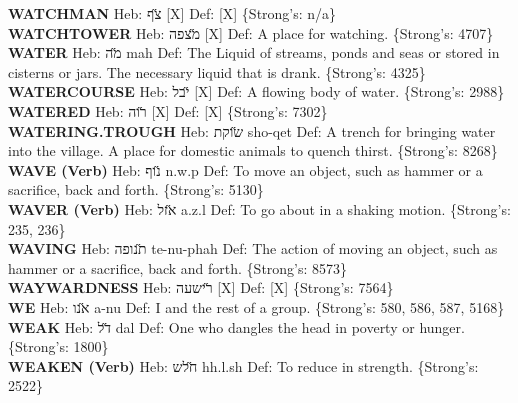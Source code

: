 {\textbf{WATCHMAN} Heb: {\large\H צף} {[}X{]} Def: {[}X{]} \{Strong's: n/a\}\hfill{}\\

\textbf{WATCHTOWER} Heb: {\large\H מצפה} {[}X{]} Def: A place for watching. \{Strong's: 4707\}\hfill{}\\

\textbf{WATER} Heb: {\large\H מה} mah Def: The Liquid of streams, ponds and seas or stored in cisterns or jars. The necessary liquid that is drank. \{Strong's: 4325\}\hfill{}\\

\textbf{WATERCOURSE} Heb: {\large\H יבל} {[}X{]} Def: A flowing body of water. \{Strong's: 2988\}\hfill{}\\

\textbf{WATERED} Heb: {\large\H רוה} {[}X{]} Def: {[}X{]} \{Strong's: 7302\}\hfill{}\\

\textbf{WATERING.TROUGH} Heb: {\large\H שוקת} sho-qet Def: A trench for bringing water into the village. A place for domestic animals to quench thirst. \{Strong's: 8268\}\hfill{}\\

\textbf{WAVE (Verb)} Heb: {\large\H נוף} n.w.p Def: To move an object, such as hammer or a sacrifice, back and forth. \{Strong's: 5130\}\hfill{}\\

\textbf{WAVER (Verb)} Heb: {\large\H אזל} a.z.l Def: To go about in a shaking motion. \{Strong's: 235, 236\}\hfill{}\\

\textbf{WAVING} Heb: {\large\H תנופה} te-nu-phah Def: The action of moving an object, such as hammer or a sacrifice, back and forth. \{Strong's: 8573\}\hfill{}\\

\textbf{WAYWARDNESS} Heb: {\large\H רישעה} {[}X{]} Def: {[}X{]} \{Strong's: 7564\}\hfill{}\\

\textbf{WE} Heb: {\large\H אנו} a-nu Def: I and the rest of a group. \{Strong's: 580, 586, 587, 5168\}\hfill{}\\

\textbf{WEAK} Heb: {\large\H דל} dal Def: One who dangles the head in poverty or hunger. \{Strong's: 1800\}\hfill{}\\

\textbf{WEAKEN (Verb)} Heb: {\large\H חלש} hh.l.sh Def: To reduce in strength. \{Strong's: 2522\}\hfill{}\\

}
